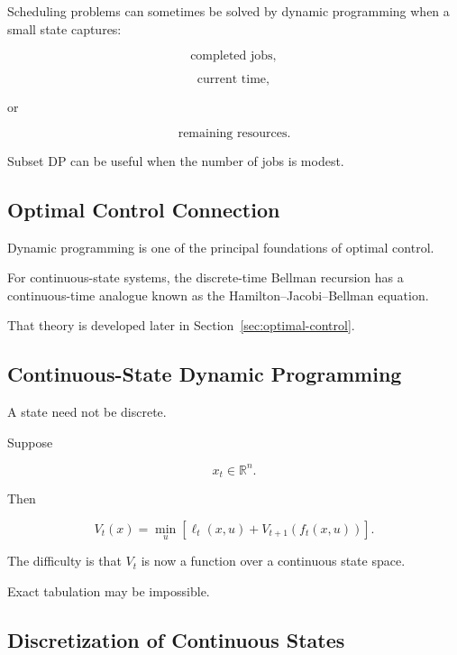 Scheduling problems can sometimes be solved by dynamic programming when a
small state captures:

\[
\boxed{
\text{completed jobs},
}
\]

\[
\boxed{
\text{current time},
}
\]

or

\[
\boxed{
\text{remaining resources}.
}
\]

Subset DP can be useful when the number of jobs is modest.

\subsection{Optimal Control Connection}
\label{subsec:optimal-control-dp-connection}

Dynamic programming is one of the principal foundations of optimal
control.

For continuous-state systems, the discrete-time Bellman recursion has a
continuous-time analogue known as the Hamilton--Jacobi--Bellman equation.

That theory is developed later in Section~\ref{sec:optimal-control}.

\subsection{Continuous-State Dynamic Programming}
\label{subsec:continuous-state-dynamic-programming}

A state need not be discrete.

Suppose

\[
x_t\in\mathbb{R}^n.
\]

Then

\[
\boxed{
V_t(x)
=
\min_u
\left[
\ell_t(x,u)
+
V_{t+1}(f_t(x,u))
\right].
}
\]

The difficulty is that \(V_t\) is now a function over a continuous state
space.

Exact tabulation may be impossible.

\subsection{Discretization of Continuous States}
\label{subsec:dp-state-discretization}

